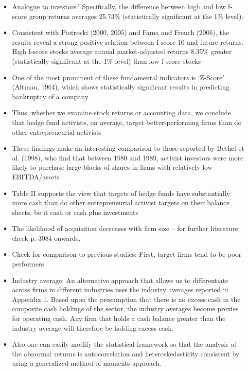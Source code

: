 \documentclass[12pt]{article}
\begin{document}
\begin{itemize}
        \item Analogue to investors? Specifically, the difference between high and low f-score group returns averages 25.73\% (statistically significant at the 1\% level). \citep{Choi2012}

        \item Consistent with Piotroski (2000, 2005) and Fama and French (2006), the results reveal a strong positive relation between f-score 10 and future returns. High f-score stocks average annual market-adjusted returns 8.35\% greater (statistically significant at the 1\% level) than low f-score stocks \citep{Choi2012} 

       \item One of the most prominent of these fundamental indicators is ‘Z-Score’ (Altman, 1964), which shows statistically significant results in predicting bankruptcy of a company \citep{Mohr2012}

       \item Thus, whether we examine stock returns or accounting data, we conclude that hedge fund activists, on average, target better-performing firms than do other entrepreneurial activists \citep{Klein2009}

       \item These findings make an interesting comparison to those reported by Bethel et al. (1998), who find that between 1980 and 1989, activist investors were more likely to purchase large blocks of shares in firms with relatively low EBITDA/assets \citep{Klein2009}

       \item Table II supports the view that targets of hedge funds have substantially more cash than do other entrepreneurial activist targets on their balance sheets, be it cash or cash plus investments \citep{Klein2009}

       \item The likelihood of acquisition decreases with firm size \citep{Akhigbe2007} -- for further literature check p. 3084 onwards.

       \item Check for comparison to previous studies: First, target firms tend to be poor performers \citep{Denes2017}

       \item Industry average: An alternative approach that allows us to differentiate across firms in different industries uses the industry averages reported in Appendix 1. Based upon the presumption that there is no excess cash in the composite cash holdings of the sector, the industry averages become proxies for operating cash. Any firm that holds a cash balance greater than the industry average will therefore be holding excess cash. \citep{Damodaran2005}

       \item Also one can easily modify the statistical framework so that the analysis of the abnormal returns is autocorrelation and heteroskedasticity consistent by using a generalized method-of-moments approach.\citep{MacKinlay1997}


    \end{itemize}
\end{document}
